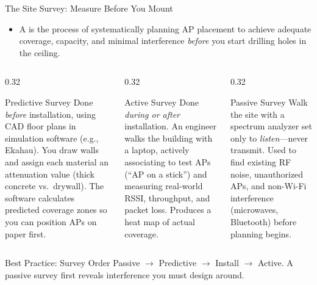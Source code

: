 \documentclass[aspectratio=169]{beamer}
\begin{document}
\begin{frame}{The Site Survey: Measure Before You Mount}
    \footnotesize
    \begin{itemize}
        \item A  is the process of systematically planning AP placement to achieve adequate coverage, capacity, and minimal interference \emph{before} you start drilling holes in the ceiling.
    \end{itemize}
    \vspace{0.2em}
    \begin{columns}[T]
        \begin{column}{0.32\textwidth}
            \begin{block}{Predictive Survey}
                \footnotesize
                Done \emph{before} installation, using CAD floor plans in simulation software (e.g., Ekahau). You draw walls and assign each material an attenuation value (thick concrete vs.\ drywall). The software calculates predicted coverage zones so you can position APs on paper first.
            \end{block}
        \end{column}
        \begin{column}{0.32\textwidth}
            \begin{block}{Active Survey}
                \footnotesize
                Done \emph{during or after} installation. An engineer walks the building with a laptop, actively associating to test APs (``AP on a stick'') and measuring real-world RSSI, throughput, and packet loss. Produces a heat map of actual coverage.
            \end{block}
        \end{column}
        \begin{column}{0.32\textwidth}
            \begin{block}{Passive Survey}
                \footnotesize
                Walk the site with a spectrum analyzer set only to \emph{listen}---never transmit. Used to find existing RF noise, unauthorized APs, and non-Wi-Fi interference (microwaves, Bluetooth) before planning begins.
            \end{block}
        \end{column}
    \end{columns}
    \vspace{0.2em}
    \begin{exampleblock}{Best Practice: Survey Order}
        \footnotesize
        Passive $\rightarrow$ Predictive $\rightarrow$ Install $\rightarrow$ Active. A passive survey first reveals interference you must design around.
    \end{exampleblock}
\end{frame}
\end{document}
